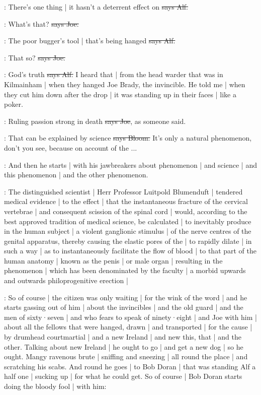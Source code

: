 \bergan:
There's one thing |
it hasn't a deterrent effect on
\sout{says Alf.}

\joe:
What's that?
\sout{says Joe.}

\bergan:
The poor bugger's tool |
that's being hanged
\sout{says Alf.}

\joe:
That so?
\sout{says Joe.}

\bergan:
God's truth
\sout{says Alf.}
I heard that |
from the head warder that was in Kilmainham |
when they hanged Joe Brady,
the invincible.
He told me |
when they cut him down after the drop |
it was standing up in their faces |
like a poker.

\joe:
Ruling passion strong in death
\sout{says Joe},
as someone said.

\Bloom:
That can be explained by science
\sout{says Bloom.}
It's only a natural phenomenon,
don't you see,
because on account of the ...

\Nq:
And then he starts |
with his jawbreakers about phenomenon |
and science |
and this phenomenon |
and the other phenomenon.

:
The distinguished scientist |
Herr Professor Luitpold Blumenduft |
tendered medical evidence |
to the effect |
that the instantaneous fracture of the cervical vertebrae |
and consequent scission of the spinal cord |
would,
according to the best approved tradition of medical science,
be calculated |
to inevitably produce in the human subject |
a violent ganglionic stimulus |
of the nerve centres of the genital apparatus,
thereby causing the elastic pores of the  |
to rapidly dilate |
in such a way |
as to instantaneously facilitate the flow of blood |
to that part of the human anatomy |
known as the penis |
or male organ |
resulting in the phenomenon |
which has been denominated by the faculty |
a morbid upwards and outwards philoprogenitive erection |

\Nq:
So of course |
the citizen was only waiting |
for the wink of the word |
and he starts gassing out of him |
about the invincibles |
and the old guard |
and the men of sixty·seven |
and who fears to speak of ninety·eight |
and Joe with him |
about all the fellows that were hanged,
drawn |
and transported |
for the cause |
by drumhead courtmartial |
and a new Ireland |
and new this,
that |
and the other.
Talking about new Ireland |
he ought to go |
and get a new dog |
so he ought.
Mangy ravenous brute |
sniffing and sneezing |
all round the place |
and scratching his scabs.
And round he goes |
to Bob Doran |
that was standing Alf a half one |
sucking up |
for what he could get.
So of course |
Bob Doran starts doing the bloody fool |
with him:


